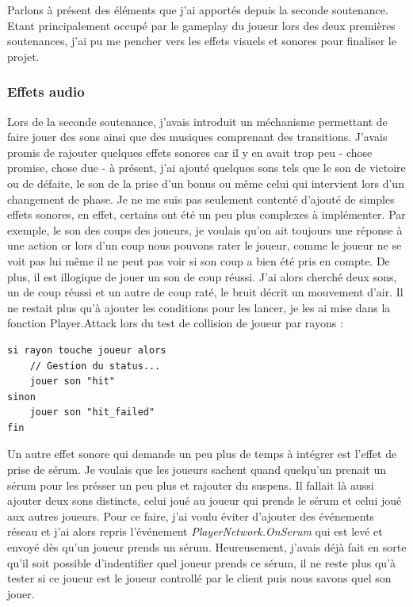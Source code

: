 \documentclass{article}
\begin{document}
Parlons à présent des éléments que j'ai apportés depuis la seconde soutenance.
Etant principalement occupé par le gameplay du joueur lors des deux premières soutenances, j'ai pu me pencher vers les effets visuels et sonores pour finaliser le projet.

\subsubsection{Effets audio}

Lors de la seconde soutenance, j'avais introduit un méchanisme permettant de faire jouer des sons ainsi que des musiques comprenant des transitions. J'avais promis de rajouter quelques effets sonores car il y en avait trop peu - chose promise, chose due - à présent, j'ai ajouté quelques sons tels que le son de victoire ou de défaite, le son de la prise d'un bonus ou même celui qui intervient lors d'un changement de phase. Je ne me suis pas seulement contenté d'ajouté de simples effets sonores, en effet, certains ont été un peu plus complexes à implémenter. Par exemple, le son des coups des joueurs, je voulais qu'on ait toujours une réponse à une action or lors d'un coup nous pouvons rater le joueur, comme le joueur ne se voit pas lui même il ne peut pas voir si son coup a bien été pris en compte. De plus, il est illogique de jouer un son de coup réussi. J'ai alors cherché deux sons, un de coup réussi et un autre de coup raté, le bruit décrit un mouvement d'air. Il ne restait plus qu'à ajouter les conditions pour les lancer, je les ai mise dans la fonction Player.Attack lors du test de collision de joueur par rayons :

\begin{lstlisting}
si rayon touche joueur alors
    // Gestion du status...
    jouer son "hit"
sinon
    jouer son "hit_failed"
fin
\end{lstlisting}

Un autre effet sonore qui demande un peu plus de temps à intégrer est l'effet de prise de sérum. Je voulais que les joueurs sachent quand quelqu'un prenait un sérum pour les présser un peu plus et rajouter du suspens. Il fallait là aussi ajouter deux sons distincts, celui joué au joueur qui prends le sérum et celui joué aux autres joueurs. Pour ce faire, j'ai voulu éviter d'ajouter des événements réseau et j'ai alors repris l'événement \emph{PlayerNetwork.OnSerum} qui est levé et envoyé dès qu'un joueur prends un sérum. Heureusement, j'avais déjà fait en sorte qu'il soit possible d'indentifier quel joueur prends ce sérum, il ne reste plus qu'à tester si ce joueur est le joueur controllé par le client puis nous savons quel son jouer.
\end{document}
